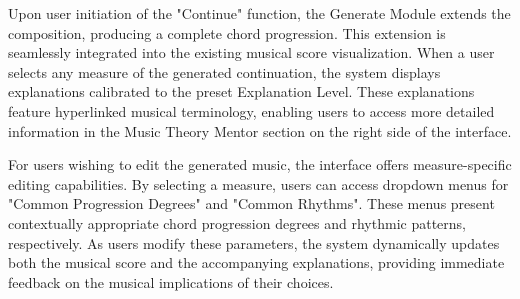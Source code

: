 Upon user initiation of the "Continue" function, the Generate Module extends the composition, producing a complete chord progression. This extension is seamlessly integrated into the existing musical score visualization. When a user selects any measure of the generated continuation, the system displays explanations calibrated to the preset Explanation Level. These explanations feature hyperlinked musical terminology, enabling users to access more detailed information in the Music Theory Mentor section on the right side of the interface.

For users wishing to edit the generated music, the interface offers measure-specific editing capabilities. By selecting a measure, users can access dropdown menus for "Common Progression Degrees" and "Common Rhythms". These menus present contextually appropriate chord progression degrees and rhythmic patterns, respectively. As users modify these parameters, the system dynamically updates both the musical score and the accompanying explanations, providing immediate feedback on the musical implications of their choices.

